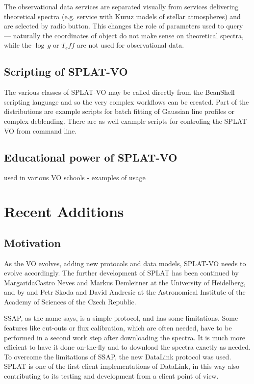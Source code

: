 \documentclass[final,authoryear,5p,times,twocolumn]{elsarticle}
\begin{document}
The observational data services are separated visually from services
delivering theoretical spectra (e.g. service with  Kuruz models of stellar
atmospheres) and are selected by radio button. This changes the role of
parameters used to query --- naturally the coordinates of object do not make
sense on theoretical spectra, while the $\log\,g$ or $T_eff$ are not used for
observational data.


\subsection{Scripting of SPLAT-VO}

The various classes of SPLAT-VO may be called directly from the
BeanShell scripting language \citep{niemeyer2013learning} and so the very complex workflows can be created.
Part of the distributions are example scripts for batch fitting of Gaussian line
profiles or complex deblending. There are as well example scripts for
controling the SPLAT-VO from command line.


\subsection{Educational power of SPLAT-VO}

used in various VO schools - examples of usage




\section{Recent Additions}


\subsection{Motivation}

As the VO evolves, adding new protocols and data models, SPLAT-VO
needs to evolve accordingly.  The further development of SPLAT has
been continued by MargaridaCastro Neves and Markus Demleitner at the
University of Heidelberg, and by and Petr Skoda and David Andresic at
the Astronomical Institute of the Academy of Sciences of the Czech
Republic.

SSAP, as the name says, is a simple protocol, and has some
limitations. Some features like cut-outs or flux calibration, which
are often needed, have to be performed in a second work step after
downloading the spectra. It is much more efficient to have it done
on-the-fly and  to download the spectra exactly as needed. To overcome
the limitations of SSAP, the new DataLink protocol \citep{datalink}
was used. SPLAT is one of the first client implementations of
DataLink, in this way also contributing to its testing and development
from a client point of view.
\end{document}
